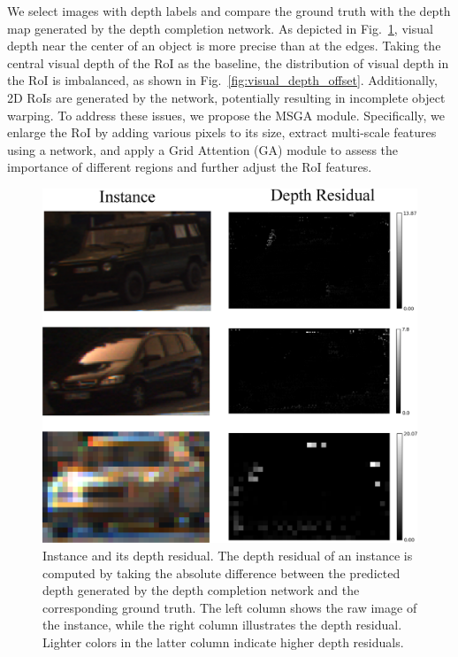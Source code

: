 \documentclass[journal]{IEEEtran}
\begin{document}
	We select images with depth labels and compare the ground truth with the depth map generated by the depth completion network. As depicted in Fig.~\ref{fig:depth_residual}, visual depth near the center of an object is more precise than at the edges. Taking the central visual depth of the RoI as the baseline, the distribution of visual depth in the RoI is imbalanced, as shown in Fig.~\ref{fig:visual_depth_offset}. Additionally, 2D RoIs are generated by the network, potentially resulting in incomplete object warping. To address these issues, we propose the MSGA module. Specifically, we enlarge the RoI by adding various pixels to its size, extract multi-scale features using a network, and apply a Grid Attention (GA) module to assess the importance of different regions and further adjust the RoI features.
	\begin{figure}[!t]
		\centering
		\includegraphics[width=1.0\linewidth]{depth_residual}
		\caption{Instance and its depth residual. The depth residual of an instance is computed by taking the absolute difference between the predicted depth generated by the depth completion network and the corresponding ground truth. The left column shows the raw image of the instance, while the right column illustrates the depth residual. Lighter colors in the latter column indicate higher depth residuals.}
		\label{fig:depth_residual}
	\end{figure}
\end{document}
